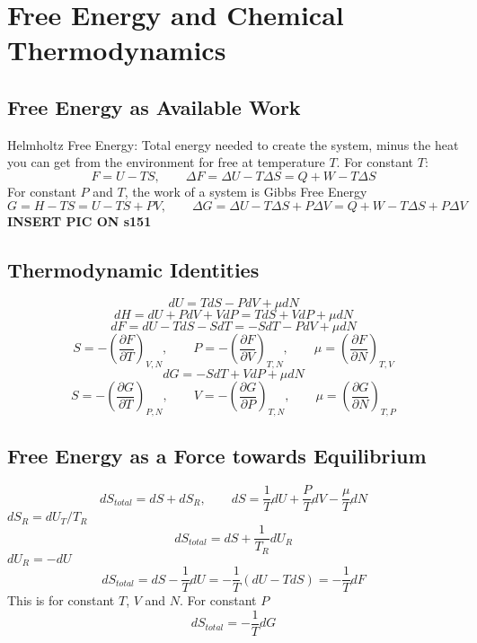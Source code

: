 \documentclass[a4paper,norsk, 10pt]{article}
\newcommand{\pd}[3]{\left(\frac{\partial #1}{\partial #2}\right)_{#3}}
\begin{document}
\section{Free Energy and Chemical Thermodynamics}
\subsection{Free Energy as Available Work}
Helmholtz Free Energy: Total energy needed to create the system, minus the heat you can get from the environment for free at temperature $T$. For constant $T$:
\begin{equation}
F = U - TS, \qquad \Delta F = \Delta U - T\Delta S = Q + W - T\Delta S
\end{equation}
For constant $P$ and $T$, the work of a system is Gibbs Free Energy
\begin{equation}
G = H - TS = U - TS + PV, \qquad \Delta G = \Delta U - T\Delta S + P\Delta V = Q+W -T\Delta S + P\Delta V
\end{equation}
\textbf{INSERT PIC ON s151}

\subsection{Thermodynamic Identities}
\begin{equation}
dU = TdS - PdV + \mu dN
\end{equation}
\begin{equation}
dH = dU + PdV + VdP = TdS + VdP + \mu dN
\end{equation}
\begin{equation}
dF = dU - TdS - SdT = - SdT - PdV + \mu dN
\end{equation}
\begin{equation}
S = -\pd{F}{T}{V,N}, \qquad P = -\pd{F}{V}{T,N},\qquad \mu = \pd{F}{N}{T,V}
\end{equation}
\begin{equation}
dG = - SdT + VdP + \mu dN
\end{equation}
\begin{equation}
S = -\pd{G}{T}{P,N}, \qquad V = -\pd{G}{P}{T,N},\qquad \mu = \pd{G}{N}{T,P}
\end{equation}
\subsection{ Free Energy as a Force towards Equilibrium}
\begin{equation}
dS_{total} = dS + dS_R, \qquad dS = \frac{1}{T}dU  + \frac{P}{T}dV - \frac{\mu}{T}dN
\end{equation}
$dS_R = dU_T/T_R$
\begin{equation}
dS_{total} = dS + \frac{1}{T_R}dU_R
\end{equation}
$dU_R = - dU$
\begin{equation}
dS_{total} = dS - \frac{1}{T}dU = -\frac{1}{T}(dU - TdS) =-\frac{1}{T}dF
\end{equation}
This is for constant $T$, $V$ and $N$. For constant $P$
\begin{equation}
dS_{total}=-\frac{1}{T}dG
\end{equation}
\end{document}
